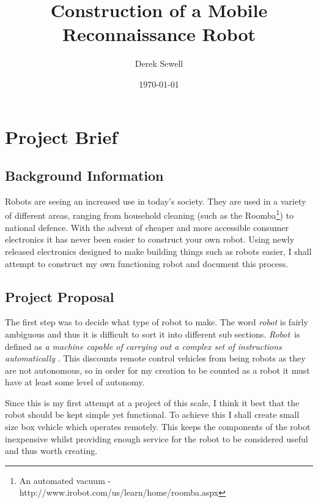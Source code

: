 \documentclass[]{report}   %
\begin{document}
		

        \title{Construction of a Mobile Reconnaissance Robot}   %
        \author{Derek Sewell}         %
        \date{\today}    %
        \maketitle
		
		


		\chapter{Project Brief}             %
			\section{Background Information}     %
				Robots are seeing an increased use in today's
				society. They are used in a variety of different areas, ranging from household cleaning
				(such as the Roomba\footnote{An automated vacuum - http://www.irobot.com/us/learn/home/roomba.aspx})
				to national defence. With the advent of cheaper and more accessible consumer electronics it has never been
				easier to construct your own robot. Using newly released electronics designed to make building things such
				as robots easier, I shall attempt to construct my own functioning robot and document this process.
			
			\section{Project Proposal}
				The first step was to decide what type of robot to make. The word \emph{robot} is fairly ambiguous and thus
				it is difficult to sort it into different sub sections. \emph{Robot}\ is defined as
				\emph{a machine capable of carrying out a complex set of instructions automatically} \cite{robotdef}.
				This discounts remote control vehicles from being robots as they are not autonomous, so in order for my 
				creation to be counted as a robot it must have at least some level of autonomy.
					
				Since this is my first attempt at a project of this scale, I think it best that the robot should be kept
				simple yet functional. To achieve this I shall create small size box vehicle which operates remotely. This
				keeps the components of the robot inexpensive whilst providing enough service for the robot to be
				considered useful and thus worth creating.
				
\end{document}
